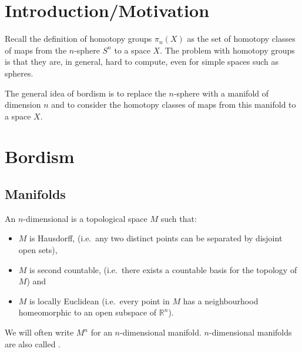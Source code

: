 \documentclass[a4paper,11pt]{article}
\begin{document}
\maketitle
{}
\tableofcontents\newpage

\begin{comment}
\newgeometry{
	left=20mm, %
    top=25mm,
    right=20mm, %
  bmargin=2cm %
}
\end{comment}

\setcounter{section}{-1}

\section{Introduction/Motivation}

Recall the definition of homotopy groups \(\pi_n(X)\) as the set of homotopy classes of maps from the \(n\)-sphere \(S^n\) to a space \(X\). 
The problem with homotopy groups is that they are, in general, hard to compute, even for simple spaces such as spheres. 

The general idea of bordism is to replace the \(n\)-sphere with a manifold of dimension \(n\) and to consider the homotopy classes of maps from this manifold to a space \(X\).


\section{Bordism}

\subsection{Manifolds}

\begin{definition}
    An \(n\)-dimensional  is a topological space \(M\) such that:
    \begin{itemize}
        \item \(M\) is Hausdorff, (i.e.\ any two distinct points can be separated by disjoint open sets),
        \item \(M\) is second countable, (i.e.\ there exists a countable basis for the topology of \(M\)) and
        \item \(M\) is locally Euclidean (i.e.\ every point in \(M\) has a neighbourhood homeomorphic to an open subspace of \(\mathbb{R}^n\)).
    \end{itemize}
    We will often write \(M^n\) for an \(n\)-dimensional manifold. \(n\)-dimensional manifolds are also called .
\end{definition}
\end{document}
